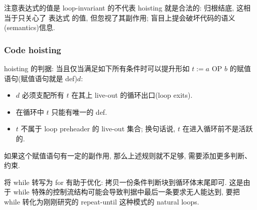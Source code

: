 注意表达式的值是 loop-invariant 的不代表 hoisting 就是合法的: 归根结底, 这相当于只关心了 表达式 的值, 但忽视了其副作用; 盲目上提会破坏代码的语义(semantics)信息. 

\subsubsection{Code hoisting}
hoisting 的判据: 当且仅当满足如下所有条件时可以提升形如 $t := a\text{ OP }b$ 的赋值语句(赋值语句就是 def)$d$:
\begin{itemize}
    \item $d$ 必须支配所有 $t$ 在其上 live-out 的循环出口(loop exits).
    \item 在循环中 $t$ 只能有唯一的 def.
    \item $t$ 不属于 loop preheader 的 live-out 集合; 换句话说, $t$ 在进入循环前不是活跃的. 
\end{itemize}

如果这个赋值语句有一定的副作用, 那么上述规则就不足够, 需要添加更多判断、约束. 

将 while 转写为 for 有助于优化: 拷贝一份条件判断块到循环体末尾即可. 这是由于 while 特殊的控制流结构可能会导致判据中最后一条要求无人能达到, 要把 while 转化为刚刚研究的 repeat-until 这种模式的 natural loops.